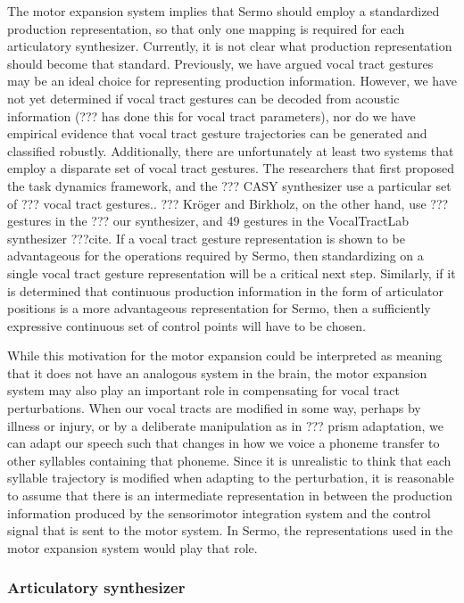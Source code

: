 The motor expansion system implies
that Sermo should employ
a standardized production representation,
so that only one mapping is required
for each articulatory synthesizer.
Currently, it is not clear
what production representation
should become that standard.
Previously, we have argued
vocal tract gestures may be an
ideal choice for representing production information.
However, we have not yet determined
if vocal tract gestures can be decoded
from acoustic information
(??? has done this for vocal tract parameters),
nor do we have empirical evidence
that vocal tract gesture trajectories
can be generated and classified robustly.
Additionally, there are unfortunately
at least two systems that employ
a disparate set of vocal tract gestures.
The researchers that first proposed
the task dynamics framework,
and the ??? CASY synthesizer
use a particular set of ??? vocal tract gestures..
??? Kr\"{o}ger and Birkholz,
on the other hand,
use ??? gestures in the
??? our synthesizer,
and 49 gestures in the VocalTractLab
synthesizer ???cite.
If a vocal tract gesture representation
is shown to be advantageous
for the operations required by Sermo,
then standardizing on a single
vocal tract gesture representation
will be a critical next step.
Similarly,
if it is determined that
continuous production information
in the form of articulator positions
is a more advantageous representation
for Sermo,
then a sufficiently expressive
continuous set of control points
will have to be chosen.

While this motivation for the
motor expansion could be interpreted
as meaning that it does not
have an analogous system in the brain,
the motor expansion system
may also play an important role
in compensating for vocal tract perturbations.
When our vocal tracts are modified in some way,
perhaps by illness or injury,
or by a deliberate manipulation
as in ??? prism adaptation,
we can adapt our speech
such that changes in how we voice a phoneme
transfer to other syllables containing that phoneme.
Since it is unrealistic to think that
each syllable trajectory is modified
when adapting to the perturbation,
it is reasonable to assume that
there is an intermediate representation
in between the production information
produced by the sensorimotor integration system
and the control signal that is sent
to the motor system.
In Sermo, the representations used
in the motor expansion system
would play that role.

\subsubsection{Articulatory synthesizer}

